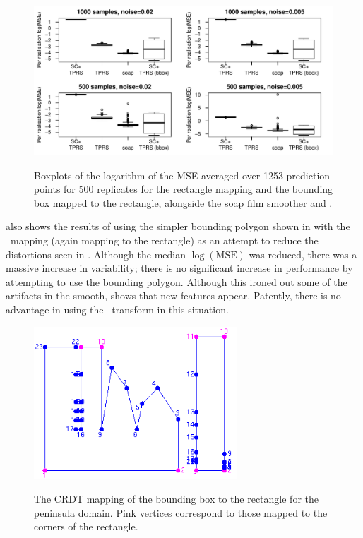 \begin{figure}[p]
\centering
\includegraphics[width=6in]{sc/figs/wigglytop2-boxplot.pdf} \\
\caption{Boxplots of the logarithm of the MSE averaged over 1253 prediction points for 500 replicates for the rectangle mapping and the bounding box mapped to the rectangle, alongside the soap film smoother and \tprs.}
\label{wigglytop2-boxplots}
\end{figure}


 also shows the results of using the simpler bounding polygon shown in  with the \sch\ mapping (again mapping to the rectangle) as  an attempt to reduce the distortions seen in . Although the median $\log(\text{MSE})$ was reduced, there was a massive increase in variability; there is no significant increase in performance by attempting to use the bounding polygon. Although this ironed out some of the artifacts in the smooth,  shows that new features appear. Patently, there is no advantage in using the \sch\ transform in this situation.



\begin{figure}
\centering
\includegraphics[width=3in]{sc/figs/wigglytop2-bbox-numbered.png} \\
\caption{The CRDT mapping of the bounding box to the rectangle for the peninsula domain. Pink vertices correspond to those mapped to the corners of the rectangle.}
\label{wigglytop2-bbox-numbered}
\end{figure}


